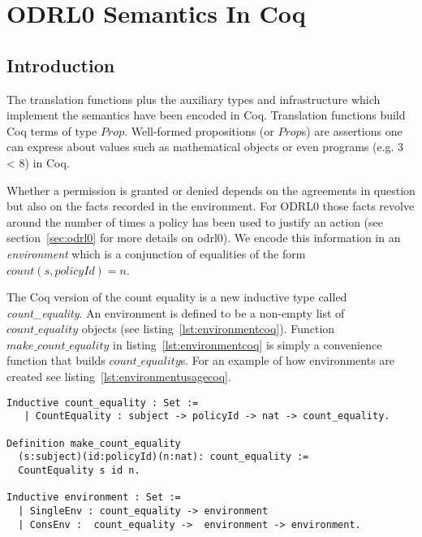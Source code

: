 \chapter{ODRL0 Semantics In Coq}


\section{Introduction}
\label{sec:envConsistentP}  

The translation functions plus the auxiliary types and infrastructure which implement the semantics have been encoded in Coq. Translation functions build Coq terms of type $Prop$. Well-formed propositions (or $Prop$s) are assertions one can express about values such as mathematical objects or even programs (e.g. 3 < 8) in Coq. 

Whether a permission is granted or denied depends on the agreements in question but also on the facts recorded in the environment. For ODRL0 those facts revolve around the number of times a policy has been used to justify an action (see section~\ref{sec:odrl0} for more details on odrl0). We encode this information in an \emph{environment} which is a conjunction of equalities of the form $count(s, policyId) = n$. 

The Coq version of the count equality is a new inductive type called \emph{count\_equality}. An environment is defined to be a non-empty list of $count\_equality$ objects (see listing~\ref{lst:environmentcoq}). Function $make\_count\_equality$ in listing~\ref{lst:environmentcoq} is simply a convenience function that builds $count\_equality$s. For an example of how environments are created see listing~\ref{lst:environmentusagecoq}.

\begin{lstlisting}
Inductive count_equality : Set := 
   | CountEquality : subject -> policyId -> nat -> count_equality.

Definition make_count_equality
  (s:subject)(id:policyId)(n:nat): count_equality :=
  CountEquality s id n.
  
Inductive environment : Set := 
  | SingleEnv : count_equality -> environment
  | ConsEnv :  count_equality ->  environment -> environment.

\end{lstlisting}

